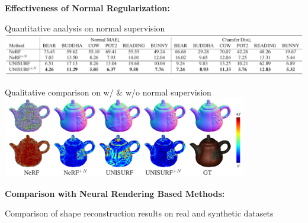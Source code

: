 \documentclass[landscape,a0paper,fontscale=0.292]{baposter}
\begin{document}
\begin{poster}
{\begin{minipage}[t]{0.49\textwidth}
        \vspace{-0.5em}
        \textbf{\color{ctitle}Effectiveness of Normal Regularization:}
        \vspace{-0.6em}
        \begin{center}
            Quantitative analysis on normal supervision \\
            \includegraphics[width=\textwidth]{images/table_analysis_normal.pdf}
        \end{center}
        \vspace{-1.8em}
        \begin{center}
            Qualitative comparison on w/ \& w/o normal supervision \\[0.2em]
            \includegraphics[width=0.8\textwidth]{images/fig_analysis_normal.pdf}
        \end{center}
    \end{minipage}\hfill
    \begin{minipage}[t]{0.49\textwidth}
        \textbf{\color{ctitle}Comparison with Neural Rendering Based Methods:} 
        \vspace{-0.6em}
        \begin{center}
            Comparison of shape reconstruction results on real and synthetic datasets \\

\end{center}
\end{minipage}}
\end{poster}
\end{document}

